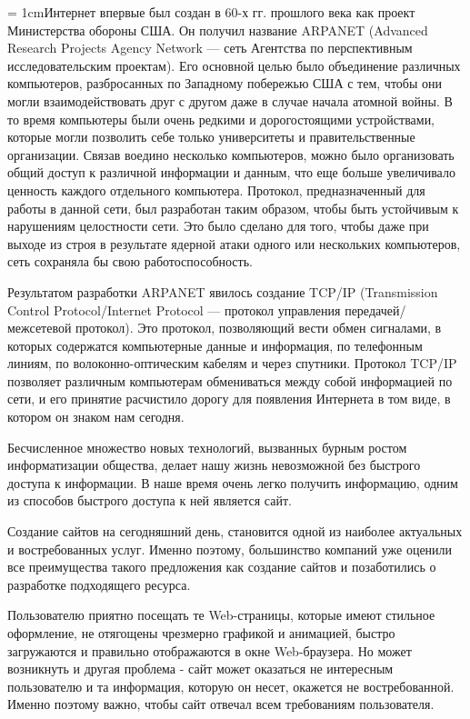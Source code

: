 \documentclass[14pt,a4paper]{extreport}
\begin{document}
	\parindent = 1cmИнтернет впервые был создан в 60-х гг. прошлого века как проект Министерства обороны США. Он получил название ARPANET (Advanced Research Projects Agency Network — сеть Агентства по перспективным исследовательским проектам). Его основной целью было объединение различных компьютеров, разбросанных по Западному побережью США с тем, чтобы они могли взаимодействовать друг с другом даже в случае начала атомной войны. В то время компьютеры были очень редкими и дорогостоящими устройствами, которые могли позволить себе только университеты и правительственные организации. Связав воедино несколько компьютеров, можно было организовать общий доступ к различной информации и данным, что еще больше увеличивало ценность каждого отдельного компьютера. Протокол, предназначенный для работы в данной сети, был разработан таким образом, чтобы быть устойчивым к нарушениям целостности сети. Это было сделано для того, чтобы даже при выходе из строя в результате ядерной атаки одного или нескольких компьютеров, сеть сохраняла бы свою работоспособность.\par
	Результатом разработки ARPANET явилось создание TCP/IP (Transmission Control Protocol/Internet Protocol — протокол управления передачей/межсетевой протокол). Это протокол, позволяющий вести обмен сигналами, в которых содержатся компьютерные данные и информация, по телефонным линиям, по волоконно-оптическим кабелям и через спутники. Протокол TCP/IP позволяет различным компьютерам обмениваться между собой информацией по сети, и его принятие расчистило дорогу для появления Интернета в том виде, в котором он знаком нам сегодня.\par
	Бесчисленное множество новых технологий, вызванных бурным ростом информатизации общества, делает нашу жизнь невозможной без быстрого доступа к информации. В наше время очень легко получить информацию, одним из способов быстрого доступа к ней является сайт.\par
	Создание сайтов на сегодняшний день, становится одной из наиболее актуальных и востребованных услуг. Именно поэтому, большинство компаний уже оценили все преимущества такого предложения как создание сайтов и позаботились о разработке подходящего ресурса.\par
	Пользователю приятно посещать те Web-страницы, которые имеют стильное оформление, не отягощены чрезмерно графикой и анимацией, быстро загружаются и правильно отображаются в окне Web-браузера. Но может возникнуть и другая проблема - сайт может оказаться не интересным пользователю и та информация, которую он несет, окажется не востребованной. Именно поэтому важно, чтобы сайт отвечал всем требованиям пользователя.\par
\end{document}

